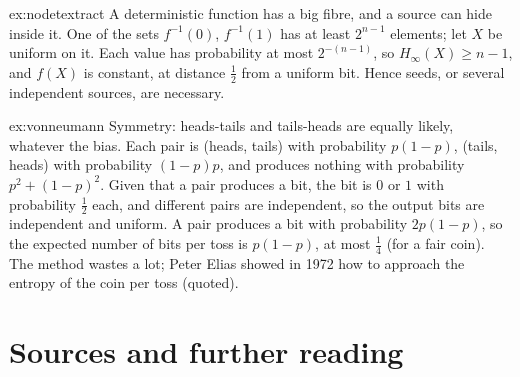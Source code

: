 \begin{solution}{ex:nodetextract}
\idea A deterministic function has a big fibre, and a source can hide inside it.
\writeup One of the sets $f^{-1}(0)$, $f^{-1}(1)$ has at least $2^{n-1}$ elements; let $X$ be uniform on it. Each value has probability at most $2^{-(n-1)}$, so $H_\infty(X)\ge n-1$, and $f(X)$ is constant, at distance $\frac12$ from a uniform bit. Hence seeds, or several independent sources, are necessary.
\end{solution}

\begin{solution}{ex:vonneumann}
\idea Symmetry: heads-tails and tails-heads are equally likely, whatever the bias.
\writeup Each pair is (heads, tails) with probability $p(1-p)$, (tails, heads) with probability $(1-p)p$, and produces nothing with probability $p^2+(1-p)^2$. Given that a pair produces a bit, the bit is $0$ or $1$ with probability $\frac12$ each, and different pairs are independent, so the output bits are independent and uniform. A pair produces a bit with probability $2p(1-p)$, so the expected number of bits per toss is $p(1-p)$, at most $\frac14$ (for a fair coin). The method wastes a lot; Peter Elias showed in 1972 how to approach the entropy of the coin per toss (quoted).
\end{solution}

\section*{Sources and further reading}

